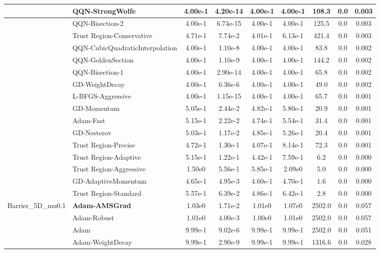 \documentclass{article}
\begin{document}
\begin{longtable}{|l|l|c|c|c|c|c|c|c|}
\hline
 & QQN-StrongWolfe & 4.00e-1 & 4.20e-14 & 4.00e-1 & 4.00e-1 & 108.3 & 0.0 & 0.003 \\
\hline
 & QQN-Bisection-2 & 4.00e-1 & 6.74e-15 & 4.00e-1 & 4.00e-1 & 125.5 & 0.0 & 0.003 \\
\hline
 & Trust Region-Conservative & 4.71e-1 & 7.74e-2 & 4.01e-1 & 6.13e-1 & 421.4 & 0.0 & 0.003 \\
\hline
 & QQN-CubicQuadraticInterpolation & 4.00e-1 & 1.10e-8 & 4.00e-1 & 4.00e-1 & 83.8 & 0.0 & 0.002 \\
\hline
 & QQN-GoldenSection & 4.00e-1 & 1.10e-9 & 4.00e-1 & 4.00e-1 & 144.2 & 0.0 & 0.002 \\
\hline
 & QQN-Bisection-1 & 4.00e-1 & 2.90e-14 & 4.00e-1 & 4.00e-1 & 65.8 & 0.0 & 0.002 \\
\hline
 & GD-WeightDecay & 4.00e-1 & 6.36e-6 & 4.00e-1 & 4.00e-1 & 49.0 & 0.0 & 0.002 \\
\hline
 & L-BFGS-Aggressive & 4.00e-1 & 1.15e-15 & 4.00e-1 & 4.00e-1 & 65.7 & 0.0 & 0.001 \\
\hline
 & GD-Momentum & 5.05e-1 & 2.44e-2 & 4.82e-1 & 5.80e-1 & 20.9 & 0.0 & 0.001 \\
\hline
 & Adam-Fast & 5.15e-1 & 2.22e-2 & 4.74e-1 & 5.54e-1 & 31.4 & 0.0 & 0.001 \\
\hline
 & GD-Nesterov & 5.03e-1 & 1.17e-2 & 4.85e-1 & 5.26e-1 & 20.4 & 0.0 & 0.001 \\
\hline
 & Trust Region-Precise & 4.72e-1 & 1.30e-1 & 4.07e-1 & 8.14e-1 & 72.3 & 0.0 & 0.001 \\
\hline
 & Trust Region-Adaptive & 5.15e-1 & 1.22e-1 & 4.42e-1 & 7.59e-1 & 6.2 & 0.0 & 0.000 \\
\hline
 & Trust Region-Aggressive & 1.50e0 & 5.56e-1 & 5.85e-1 & 2.09e0 & 5.0 & 0.0 & 0.000 \\
\hline
 & GD-AdaptiveMomentum & 4.65e-1 & 4.95e-3 & 4.60e-1 & 4.70e-1 & 1.6 & 0.0 & 0.000 \\
\hline
 & Trust Region-Standard & 5.57e-1 & 6.39e-2 & 4.86e-1 & 6.42e-1 & 2.8 & 0.0 & 0.000 \\
Barrier\_5D\_mu0.1 & \textbf{Adam-AMSGrad} & 1.03e0 & 1.71e-2 & 1.01e0 & 1.07e0 & 2502.0 & 0.0 & 0.057 \\
\hline
 & Adam-Robust & 1.01e0 & 4.00e-3 & 1.00e0 & 1.01e0 & 2502.0 & 0.0 & 0.057 \\
\hline
 & Adam & 9.99e-1 & 9.02e-6 & 9.99e-1 & 9.99e-1 & 2502.0 & 0.0 & 0.051 \\
\hline
 & Adam-WeightDecay & 9.99e-1 & 2.90e-9 & 9.99e-1 & 9.99e-1 & 1316.6 & 0.0 & 0.028 \\

\end{longtable}
\end{document}
